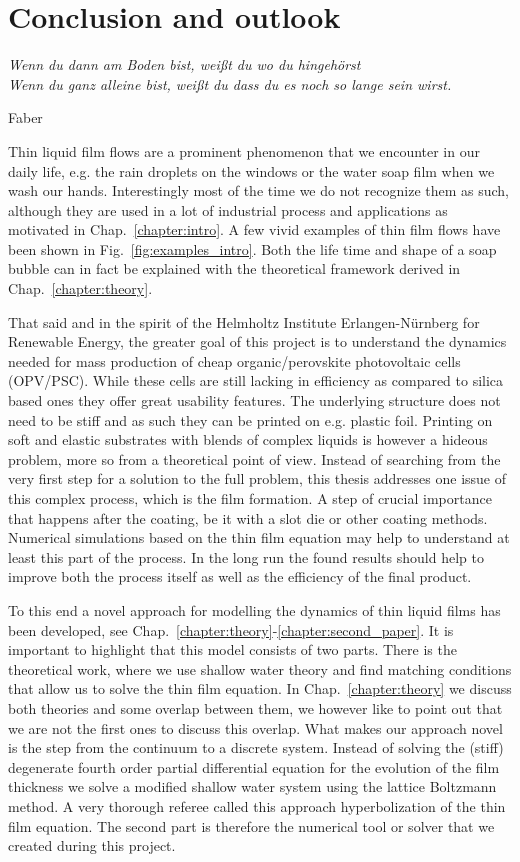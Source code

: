 \chapter{Conclusion and outlook}
\label{chapter:conclusion}
\epigraph{\textit{Wenn du dann am Boden bist, weißt du wo du hingehörst\\ Wenn du ganz alleine bist, weißt du dass du es noch so lange sein wirst.}}{Faber}

Thin liquid film flows are a prominent phenomenon that we encounter in our daily life, e.g. the rain droplets on the windows or the water soap film when we wash our hands.
Interestingly most of the time we do not recognize them as such, although they are used in a lot of industrial process and applications as motivated in Chap.~\ref{chapter:intro}.
A few vivid examples of thin film flows have been shown in Fig.~\ref{fig:examples_intro}. 
Both the life time and shape of a soap bubble can in fact be explained with the theoretical framework derived in Chap.~\ref{chapter:theory}.

That said and in the spirit of the Helmholtz Institute Erlangen-Nürnberg for Renewable Energy, the greater goal of this project is to understand the dynamics needed for mass production of cheap organic/perovskite photovoltaic cells (OPV/PSC).
While these cells are still lacking in efficiency as compared to silica based ones they offer great usability features.
The underlying structure does not need to be stiff and as such they can be printed on e.g. plastic foil.
Printing on soft and elastic substrates with blends of complex liquids is however a hideous problem, more so from a theoretical point of view.
Instead of searching from the very first step for a solution to the full problem, this thesis addresses one issue of this complex process, which is the film formation.
A step of crucial importance that happens after the coating, be it with a slot die or other coating methods.
Numerical simulations based on the thin film equation may help to understand at least this part of the process.
In the long run the found results should help to improve both the process itself as well as the efficiency of the final product.

To this end a novel approach for modelling the dynamics of thin liquid films has been developed, see Chap.~\ref{chapter:theory}-\ref{chapter:second_paper}.
It is important to highlight that this model consists of two parts. 
There is the theoretical work, where we use shallow water theory and find matching conditions that allow us to solve the thin film equation. 
In Chap.~\ref{chapter:theory} we discuss both theories and some overlap between them, we however like to point out that we are not the first ones to discuss this overlap.  
What makes our approach novel is the step from the continuum to a discrete system. 
Instead of solving the (stiff) degenerate fourth order partial differential equation for the evolution of the film thickness we solve a modified shallow water system using the lattice Boltzmann method.
A very thorough referee called this approach hyperbolization of the thin film equation.
The second part is therefore the numerical tool or solver that we created during this project.  

